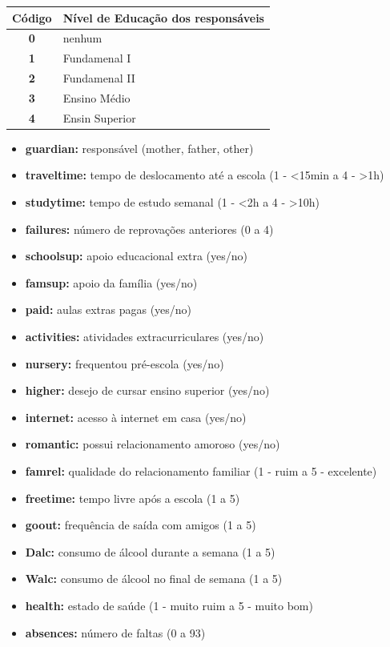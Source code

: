 \documentclass[
  letterpaper,
  DIV=11,
  numbers=noendperiod,
  openany]{scrreprt}
\providecommand{\tightlist}{%
  \setlength{\itemsep}{0pt}\setlength{\parskip}{0pt}}
\begin{document}
\begin{longtable}[]{@{}cl@{}}
\toprule\noalign{}
Código & Nível de Educação dos responsáveis \\
\midrule\noalign{}
\endhead
\bottomrule\noalign{}
\endlastfoot
\textbf{0} & nenhum \\
\textbf{1} & Fundamenal I \\
\textbf{2} & Fundamenal II \\
\textbf{3} & Ensino Médio \\
\textbf{4} & Ensin Superior \\
\end{longtable}

\begin{itemize}
\tightlist
\item
  \textbf{guardian:} responsável (mother, father, other)
\item
  \textbf{traveltime:} tempo de deslocamento até a escola (1 -
  \textless15min a 4 - \textgreater1h)
\item
  \textbf{studytime:} tempo de estudo semanal (1 - \textless2h a 4 -
  \textgreater10h)
\item
  \textbf{failures:} número de reprovações anteriores (0 a 4)
\item
  \textbf{schoolsup:} apoio educacional extra (yes/no)
\item
  \textbf{famsup:} apoio da família (yes/no)
\item
  \textbf{paid:} aulas extras pagas (yes/no)
\item
  \textbf{activities:} atividades extracurriculares (yes/no)
\item
  \textbf{nursery:} frequentou pré-escola (yes/no)
\item
  \textbf{higher:} desejo de cursar ensino superior (yes/no)
\item
  \textbf{internet:} acesso à internet em casa (yes/no)
\item
  \textbf{romantic:} possui relacionamento amoroso (yes/no)
\item
  \textbf{famrel:} qualidade do relacionamento familiar (1 - ruim a 5 -
  excelente)
\item
  \textbf{freetime:} tempo livre após a escola (1 a 5)
\item
  \textbf{goout:} frequência de saída com amigos (1 a 5)
\item
  \textbf{Dalc:} consumo de álcool durante a semana (1 a 5)
\item
  \textbf{Walc:} consumo de álcool no final de semana (1 a 5)
\item
  \textbf{health:} estado de saúde (1 - muito ruim a 5 - muito bom)
\item
  \textbf{absences:} número de faltas (0 a 93)
\end{itemize}
\end{document}
